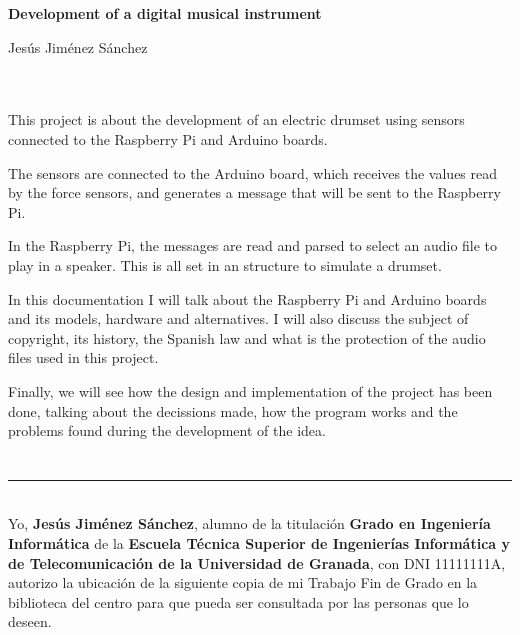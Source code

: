 \cleardoublepage

\thispagestyle{empty}

\begin{center}
       {\large\bfseries Development of a digital musical instrument}\\
\end{center}

\begin{center}
    Jesús Jiménez Sánchez\\
\end{center}

\\

\vspace{0.7cm}
\\

This project is about the development of an electric drumset using sensors connected to the Raspberry Pi and Arduino
boards.

The sensors are connected to the Arduino board, which receives the values read by the force sensors, and generates a
message that will be sent to the Raspberry Pi.

In the Raspberry Pi, the messages are read and parsed to select an audio file to play in a speaker.
This is all set in an structure to simulate a drumset.

In this documentation I will talk about the Raspberry Pi and Arduino boards and its models, hardware and alternatives. I
will also discuss the subject of copyright, its history, the Spanish law and what is the protection of the audio files
used in this project.

Finally, we will see how the design and implementation of the project has been done, talking about the decissions made,
how the program works and the problems found during the development of the idea.

\chapter*{}   %

\thispagestyle{empty}

\noindent\rule[-1ex]{\textwidth}{2pt}\\[4.5ex]

Yo, \textbf{Jesús Jiménez Sánchez}, alumno de la titulación \textbf{Grado en Ingeniería Informática} de la
\textbf{Escuela Técnica Superior de Ingenierías Informática y de Telecomunicación de la Universidad de Granada}, con DNI
11111111A, autorizo la ubicación de la siguiente copia de mi Trabajo Fin de Grado en la biblioteca del centro para que
pueda ser consultada por las personas que lo deseen.

